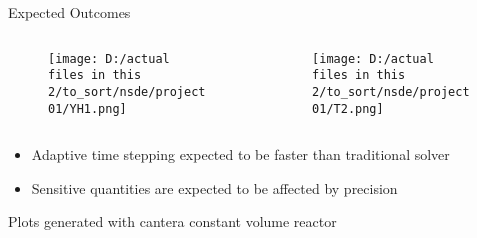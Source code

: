 \documentclass{beamer}
\begin{document}
\begin{frame}{Expected Outcomes}
    \begin{columns}
        \begin{column}{0.5\textwidth}
            \begin{figure}[h!]
                \captionsetup{labelformat=empty, labelsep=none, justification=centering}
                \centering
                \texttt{[image: D:/actual files in this 2/to\_sort/nsde/project01/YH1.png]}
                \vspace*{-3mm}
                \caption{}
                \label{fig01}
            \end{figure}
        \end{column}

        \begin{column}{0.5\textwidth}
            \begin{figure}[h!]
                \captionsetup{labelformat=empty, labelsep=none, justification=centering}
                \centering
                \texttt{[image: D:/actual files in this 2/to\_sort/nsde/project01/T2.png]}
                \vspace*{-3mm}
                \caption{}
                \label{fig02}
            \end{figure}
        \end{column}
    \end{columns}
\vspace*{-1cm}
\begin{itemize}
    \item Adaptive time stepping expected to be faster than traditional solver
    \item Sensitive quantities are expected to be affected by precision
\end{itemize}
\vspace*{3mm}
\tiny
\raggedright
\noindent
Plots generated with cantera constant volume reactor
\end{frame}


\end{document}
